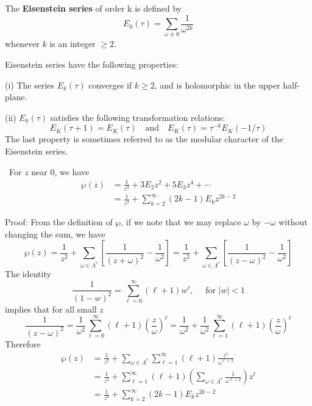 \documentclass[12pt, oneside]{book}
\begin{document}
\begin{definition}
    The \textbf{Eisenstein series} of order k is defined by
    \begin{equation*}
        E_k(\tau)=\sum_{\omega\neq 0}\frac{1}{\omega^{2k}}
    \end{equation*}
    whenever $k$ is an integer $\geq 2$.
\end{definition}
\begin{theorem}
    Eisenstein series have the following properties:

    (i) The series $E_k(\tau)$ converges if $k\geq 2$, and is holomorphic in the upper half-plane.

    (ii) $E_k(\tau)$ satisfies the following transformation relations:
    $$E_K(\tau+1)=E_K(\tau)\quad\text{and}\quad E_K(\tau)=\tau^{-k}E_K(-1/\tau)$$
    The last property is sometimes referred to as the modular character of the Eisenstein series.
\end{theorem}
\begin{theorem}\
    For $z$ near $0$, we have
    $$\begin{aligned}
            \wp(z) & = \frac{1}{z^2} + 3E_2z^2 + 5E_3z^4 + \cdots         \\
                   & =\frac{1}{z^2}+\sum_{k=2}^\infty(2k-1) E_{k}z^{2k-2}
        \end{aligned}$$

    Proof: From the definition of $\wp$, if we note that we may replace $\omega$ by $-\omega$ without changing the sum, we have
    $$\wp(z)=\frac{1}{z^2}+\sum_{\omega\in\Lambda^*}\left[\frac{1}{(z+\omega)^2}-\frac{1}{\omega^2}\right]=\frac{1}{z^2}+\sum_{\omega\in\Lambda^*}\left[\frac{1}{(z-\omega)^2}-\frac{1}{\omega^2}\right]$$
    The identity
    $$\frac{1}{(1-w)^2}=\sum_{\ell=0}^\infty(\ell+1)w^\ell,\quad\text{ for }\left|w\right|<1$$
    implies that for all small $z$
    $$\frac{1}{(z-\omega)^2}=\frac{1}{\omega^2}\sum_{\ell=0}^\infty\left(\ell+1\right)\left(\frac{z}{\omega}\right)^\ell=\frac{1}{\omega^2}+\frac{1}{\omega^2}\sum_{\ell=1}^\infty\left(\ell+1\right)\left(\frac{z}{\omega}\right)^\ell$$
    Therefore
    $$\begin{aligned}
            \wp(z) & =\frac{1}{z^2}+\sum_{\omega\in\Lambda^*}\sum_{\ell=1}^\infty(\ell+1)\frac{z^\ell}{\omega^{\ell+2}}                          \\
                   & =\frac{1}{z^2}+\sum_{\ell=1}^\infty\left(\ell+1\right)\left(\sum_{\omega\in\Lambda^*}\frac{1}{\omega^{\ell+2}}\right)z^\ell \\
                   & =\frac{1}{z^2}+\sum_{k=2}^\infty(2k-1) E_{k}z^{2k-2}
        \end{aligned}$$
\end{theorem}
\end{document}
